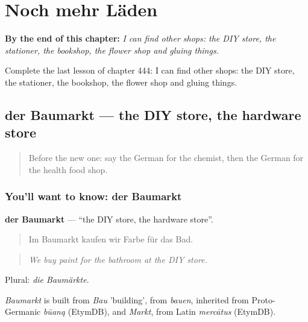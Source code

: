 
\chapter{Noch mehr Läden}
\label{ch:ge-noch-mehr-laden}

\begin{chapteropening}
\textbf{By the end of this chapter:} \emph{I can find other shops: the DIY store, the stationer, the bookshop, the flower shop and gluing things.}

Complete the last lesson of chapter 444: I can find other shops: the DIY store, the stationer, the bookshop, the flower shop and gluing things.
\end{chapteropening}

\section[der Baumarkt]{der Baumarkt — the DIY store, the hardware store}

\label{lesson:GE-C444-baumarkt}



\begin{quote}
Before the new one: say the German for the chemist, then the German for the health food shop.
\end{quote}

\subsection*{You'll want to know: der Baumarkt}
\textbf{der Baumarkt} — \textquotedblleft{}the DIY store, the hardware store\textquotedblright{}.

\begin{quote}
Im Baumarkt kaufen wir Farbe für das Bad.
\end{quote}

\begin{quote}
\emph{We buy paint for the bathroom at the DIY store.}
\end{quote}

Plural: \emph{die Baumärkte}.

\begin{cousinweb}
\emph{Baumarkt} is built from \emph{Bau} 'building', from \emph{bauen}, inherited from Proto-Germanic \emph{būaną} (EtymDB), and \emph{Markt}, from Latin \emph{mercātus} (EtymDB).
\end{cousinweb}

